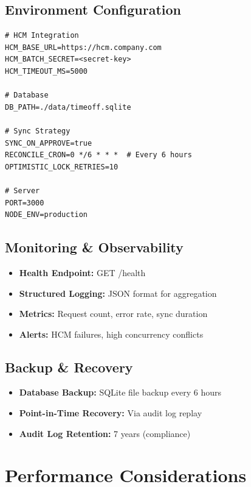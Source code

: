 \documentclass[12pt,a4paper]{article}
\begin{document}
\subsection{Environment Configuration}

\begin{lstlisting}
# HCM Integration
HCM_BASE_URL=https://hcm.company.com
HCM_BATCH_SECRET=<secret-key>
HCM_TIMEOUT_MS=5000

# Database
DB_PATH=./data/timeoff.sqlite

# Sync Strategy
SYNC_ON_APPROVE=true
RECONCILE_CRON=0 */6 * * *  # Every 6 hours
OPTIMISTIC_LOCK_RETRIES=10

# Server
PORT=3000
NODE_ENV=production
\end{lstlisting}

\subsection{Monitoring \& Observability}

\begin{itemize}
    \item \textbf{Health Endpoint:} GET /health
    \item \textbf{Structured Logging:} JSON format for aggregation
    \item \textbf{Metrics:} Request count, error rate, sync duration
    \item \textbf{Alerts:} HCM failures, high concurrency conflicts
\end{itemize}

\subsection{Backup \& Recovery}

\begin{itemize}
    \item \textbf{Database Backup:} SQLite file backup every 6 hours
    \item \textbf{Point-in-Time Recovery:} Via audit log replay
    \item \textbf{Audit Log Retention:} 7 years (compliance)
\end{itemize}

\newpage

\section{Performance Considerations}
\end{document}
